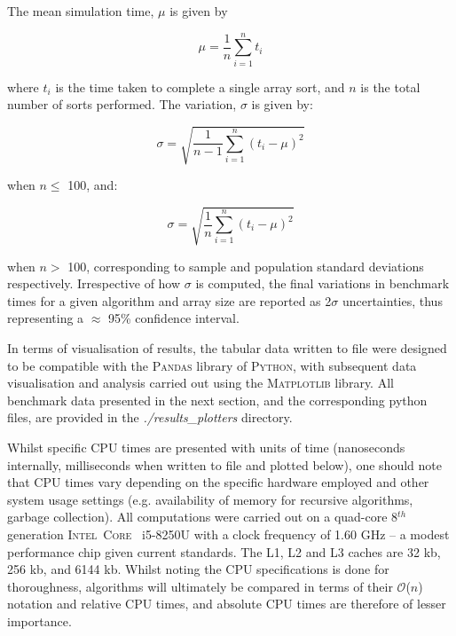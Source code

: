 \documentclass[12pt,a4paper]{article}
\begin{document}
The mean simulation time, $\mu$ is given by 

\begin{equation}
\mu = \frac{1}{n}\sum_{i=1}^{n}t_i 
\end{equation}

where $t_i$ is the time taken to complete a single array sort, and $n$ is the total number of sorts performed. The variation, $\sigma$ is given by:

\begin{equation}
\sigma = \sqrt{\frac{1}{n-1}\sum_{i=1}^{n}(t_i-\mu)^2}
\end{equation}

when $n \leq$ 100, and:

\begin{equation}
\sigma = \sqrt{\frac{1}{n}\sum_{i=1}^{n}(t_i-\mu)^2}
\end{equation}

when $n >$ 100, corresponding to sample and population standard deviations respectively. Irrespective of how $\sigma$ is computed, the final variations in benchmark times for a given algorithm and array size are reported as 2$\sigma$ uncertainties, thus representing a $\approx$ 95\% confidence interval.

In terms of visualisation of results, the tabular data written to file were designed to be compatible with the \textsc{Pandas} library of \textsc{Python}, with subsequent data visualisation and analysis carried out using the \textsc{Matplotlib} library. All benchmark data presented in the next section, and the corresponding python files, are provided in the \emph{./results\_plotters} directory.

Whilst specific CPU times are presented with units of time (nanoseconds internally, milliseconds when written to file and plotted below), one should note that CPU times vary depending on the specific hardware employed and other system usage settings (e.g. availability of memory for recursive algorithms, garbage collection). All computations were carried out on a quad-core 8$^{th}$ generation \textsc{Intel}\textregistered \ \textsc{Core} \texttrademark \ i5-8250U with a clock frequency of 1.60 GHz -- a modest performance chip given current standards. The L1, L2 and L3 caches are 32 kb, 256 kb, and 6144 kb. Whilst noting the CPU specifications is done for thoroughness, algorithms will ultimately be compared in terms of their $\mathcal{O}$($n$) notation and relative CPU times, and absolute CPU times are therefore of lesser importance.
\end{document}
